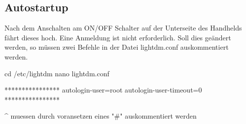 \subsection{Autostartup}

Nach dem Anschalten am ON/OFF Schalter auf der Unterseite des Handhelds fährt dieses hoch. Eine Anmeldung ist nicht erforderlich. Soll dies geändert werden, so müssen zwei Befehle in der Datei lightdm.conf auskommentiert werden. 
\begin{code}
cd /etc/lightdm
nano lightdm.conf

****************
autologin-user=root
autologin-user-timeout=0
****************

^ muessen durch voransetzen eines "#" auskommentiert werden
\end{code}